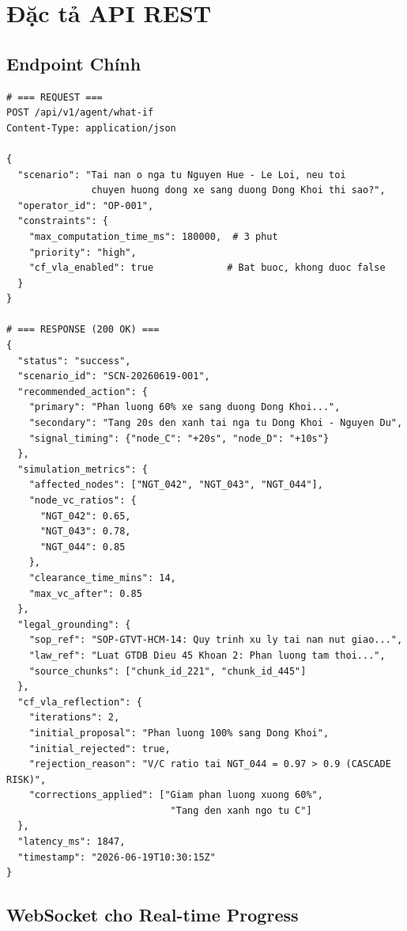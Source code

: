 \section{Đặc tả API REST}

\subsection{Endpoint Chính}

\begin{lstlisting}[caption={Request và Response cho API What-if},label={lst:api_spec}]
# === REQUEST ===
POST /api/v1/agent/what-if
Content-Type: application/json

{
  "scenario": "Tai nan o nga tu Nguyen Hue - Le Loi, neu toi
               chuyen huong dong xe sang duong Dong Khoi thi sao?",
  "operator_id": "OP-001",
  "constraints": {
    "max_computation_time_ms": 180000,  # 3 phut
    "priority": "high",
    "cf_vla_enabled": true             # Bat buoc, khong duoc false
  }
}

# === RESPONSE (200 OK) ===
{
  "status": "success",
  "scenario_id": "SCN-20260619-001",
  "recommended_action": {
    "primary": "Phan luong 60% xe sang duong Dong Khoi...",
    "secondary": "Tang 20s den xanh tai nga tu Dong Khoi - Nguyen Du",
    "signal_timing": {"node_C": "+20s", "node_D": "+10s"}
  },
  "simulation_metrics": {
    "affected_nodes": ["NGT_042", "NGT_043", "NGT_044"],
    "node_vc_ratios": {
      "NGT_042": 0.65,
      "NGT_043": 0.78,
      "NGT_044": 0.85
    },
    "clearance_time_mins": 14,
    "max_vc_after": 0.85
  },
  "legal_grounding": {
    "sop_ref": "SOP-GTVT-HCM-14: Quy trinh xu ly tai nan nut giao...",
    "law_ref": "Luat GTDB Dieu 45 Khoan 2: Phan luong tam thoi...",
    "source_chunks": ["chunk_id_221", "chunk_id_445"]
  },
  "cf_vla_reflection": {
    "iterations": 2,
    "initial_proposal": "Phan luong 100% sang Dong Khoi",
    "initial_rejected": true,
    "rejection_reason": "V/C ratio tai NGT_044 = 0.97 > 0.9 (CASCADE RISK)",
    "corrections_applied": ["Giam phan luong xuong 60%",
                             "Tang den xanh ngo tu C"]
  },
  "latency_ms": 1847,
  "timestamp": "2026-06-19T10:30:15Z"
}
\end{lstlisting}

\subsection{WebSocket cho Real-time Progress}

